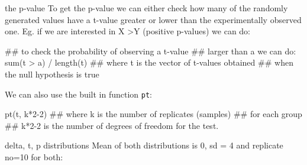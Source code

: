 \documentclass[pdf]{beamer}
\begin{document}
\begin{frame}[fragile]{the p-value}
  To get the p-value we can either check how many of the randomly
  generated values have a t-value greater or lower than the experimentally
  observed one. Eg. if we are interested in X \textgreater Y (positive
  p-values) we can do:
  \begin{rcode}
    ## to check the probability of observing a t-value 
    ## larger than a we can do:
    sum(t > a) / length(t)
    ## where t is the vector of t-values obtained
    ## when the null hypothesis is true
  \end{rcode}

  We can also use the built in function \texttt{pt}:
  \begin{rcode}
    pt(t, k*2-2)
    ## where k is the number of replicates (samples) 
    ## for each group
    ## k*2-2 is the number of degrees of freedom for the test.
  \end{rcode}
\end{frame}


\begin{frame}[fragile]{delta, t, p distributions}
  Mean of both distributions is 0, sd = 4 and replicate no=10 for both:
  \begin{figure}[ht]
  \end{figure}
\end{frame}
\end{document}
